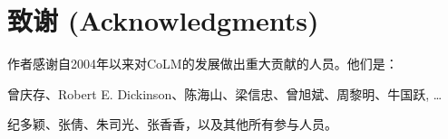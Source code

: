\chapter *{致谢 (Acknowledgments)}

作者感谢自2004年以来对CoLM的发展做出重大贡献的人员。他们是：

曾庆存、Robert E. Dickinson、陈海山、梁信忠、曾旭斌、周黎明、牛国跃, …

纪多颖、张倩、朱司光、张香香，以及其他所有参与人员。